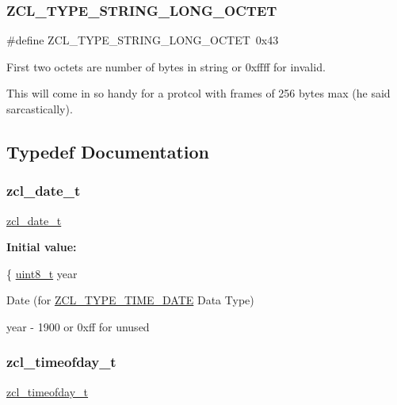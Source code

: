 \subsubsection{\texorpdfstring{Z\+C\+L\+\_\+\+T\+Y\+P\+E\+\_\+\+S\+T\+R\+I\+N\+G\+\_\+\+L\+O\+N\+G\+\_\+\+O\+C\+T\+ET}{ZCL\_TYPE\_STRING\_LONG\_OCTET}}
{\footnotesize\ttfamily \#define Z\+C\+L\+\_\+\+T\+Y\+P\+E\+\_\+\+S\+T\+R\+I\+N\+G\+\_\+\+L\+O\+N\+G\+\_\+\+O\+C\+T\+ET~0x43}



First two octets are number of bytes in string or 0xffff for invalid. 

This will come in so handy for a protcol with frames of 256 bytes max (he said sarcastically). 

\subsection{Typedef Documentation}
\mbox{\label{group__zcl__types_ga9ea8f9ebe25e922be76329748b8398b5}} 
\subsubsection{\texorpdfstring{zcl\+\_\+date\+\_\+t}{zcl\_date\_t}}
{\footnotesize\ttfamily \hyperlink{group__zcl__types_ga9ea8f9ebe25e922be76329748b8398b5}{zcl\+\_\+date\+\_\+t}}

{\bfseries Initial value\+:}
\begin{DoxyCode}
\{
   \hyperlink{group__hal__dos_gae1affc9ca37cfb624959c866a73f83c2}{uint8\_t} year
\end{DoxyCode}


Date (for \hyperlink{group__zcl__types_gad5552b0825d941f0ccd7b1d797dc091b}{Z\+C\+L\+\_\+\+T\+Y\+P\+E\+\_\+\+T\+I\+M\+E\+\_\+\+D\+A\+TE} Data Type) 

year -\/ 1900 or 0xff for unused \mbox{\label{group__zcl__types_gafa65aea1347d7c84cd0019a7e013b8f5}} 
\subsubsection{\texorpdfstring{zcl\+\_\+timeofday\+\_\+t}{zcl\_timeofday\_t}}
{\footnotesize\ttfamily \hyperlink{group__zcl__types_gafa65aea1347d7c84cd0019a7e013b8f5}{zcl\+\_\+timeofday\+\_\+t}}

